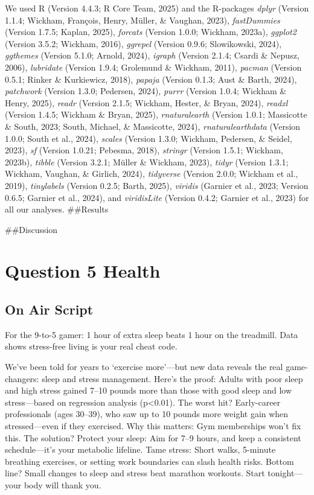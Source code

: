 \documentclass[
  man,floatsintext]{apa6}
\begin{document}
We used R (Version 4.4.3; R Core Team, 2025) and the R-packages \emph{dplyr} (Version 1.1.4; Wickham, François, Henry, Müller, \& Vaughan, 2023), \emph{fastDummies} (Version 1.7.5; Kaplan, 2025), \emph{forcats} (Version 1.0.0; Wickham, 2023a), \emph{ggplot2} (Version 3.5.2; Wickham, 2016), \emph{ggrepel} (Version 0.9.6; Slowikowski, 2024), \emph{ggthemes} (Version 5.1.0; Arnold, 2024), \emph{igraph} (Version 2.1.4; Csardi \& Nepusz, 2006), \emph{lubridate} (Version 1.9.4; Grolemund \& Wickham, 2011), \emph{pacman} (Version 0.5.1; Rinker \& Kurkiewicz, 2018), \emph{papaja} (Version 0.1.3; Aust \& Barth, 2024), \emph{patchwork} (Version 1.3.0; Pedersen, 2024), \emph{purrr} (Version 1.0.4; Wickham \& Henry, 2025), \emph{readr} (Version 2.1.5; Wickham, Hester, \& Bryan, 2024), \emph{readxl} (Version 1.4.5; Wickham \& Bryan, 2025), \emph{rnaturalearth} (Version 1.0.1; Massicotte \& South, 2023; South, Michael, \& Massicotte, 2024), \emph{rnaturalearthdata} (Version 1.0.0; South et al., 2024), \emph{scales} (Version 1.3.0; Wickham, Pedersen, \& Seidel, 2023), \emph{sf} (Version 1.0.21; Pebesma, 2018), \emph{stringr} (Version 1.5.1; Wickham, 2023b), \emph{tibble} (Version 3.2.1; Müller \& Wickham, 2023), \emph{tidyr} (Version 1.3.1; Wickham, Vaughan, \& Girlich, 2024), \emph{tidyverse} (Version 2.0.0; Wickham et al., 2019), \emph{tinylabels} (Version 0.2.5; Barth, 2025), \emph{viridis} (Garnier et al., 2023; Version 0.6.5; Garnier et al., 2024), and \emph{viridisLite} (Version 0.4.2; Garnier et al., 2023) for all our analyses.
\#\#Results

\#\#Discussion

\section{Question 5 Health}\label{question-5-health}

\subsection{On Air Script}\label{on-air-script}

For the 9-to-5 gamer: 1 hour of extra sleep beats 1 hour on the treadmill. Data shows stress-free living is your real cheat code.

We've been told for years to `exercise more'---but new data reveals the real game-changers: sleep and stress management. Here's the proof: Adults with poor sleep and high stress gained 7--10 pounds more than those with good sleep and low stress---based on regression analysis (p\textless0.01). The worst hit? Early-career professionals (ages 30--39), who saw up to 10 pounds more weight gain when stressed---even if they exercised. Why this matters: Gym memberships won't fix this. The solution? Protect your sleep: Aim for 7--9 hours, and keep a consistent schedule---it's your metabolic lifeline. Tame stress: Short walks, 5-minute breathing exercises, or setting work boundaries can slash health risks. Bottom line? Small changes to sleep and stress beat marathon workouts. Start tonight---your body will thank you.
\end{document}
